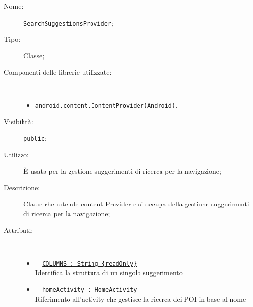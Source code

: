 \documentclass[../DefinizioneDiProdotto.tex]{subfiles}
\begin{document}
    \begin{description}
\item[Nome:] \texttt{SearchSuggestionsProvider};
\item[Tipo:] Classe;
\item[Componenti delle librerie utilizzate:] \
\begin{itemize}
\item \texttt{android.content.ContentProvider(Android)}.

\end{itemize}
\item[Visibilità:] \texttt{public};
\item[Utilizzo:] È usata per la gestione suggerimenti di ricerca per la navigazione;
\item[Descrizione:] Classe che estende content Provider e si occupa della gestione suggerimenti di ricerca per la navigazione;
\item[Attributi:] \
\begin{itemize}
\item \texttt{- \underline{COLUMNS : String \{readOnly\}}}\\
Identifica la struttura di un singolo suggerimento

\item \texttt{- homeActivity : HomeActivity}\\
Riferimento all'activity che gestisce la ricerca dei POI in base al nome


\end{itemize}
\end{description}
\end{document}
